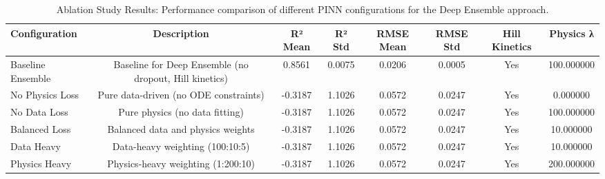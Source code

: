 \begin{table}
\caption{Ablation Study Results: Performance comparison of different PINN configurations for the Deep Ensemble approach.}
\label{tab:ablation_study}
\begin{tabular}{lccccccc}
\toprule
Configuration & Description & R² Mean & R² Std & RMSE Mean & RMSE Std & Hill Kinetics & Physics λ \\
\midrule
Baseline Ensemble & Baseline for Deep Ensemble (no dropout, Hill kinetics) & 0.8561 & 0.0075 & 0.0206 & 0.0005 & Yes & 100.000000 \\
No Physics Loss & Pure data-driven (no ODE constraints) & -0.3187 & 1.1026 & 0.0572 & 0.0247 & Yes & 0.000000 \\
No Data Loss & Pure physics (no data fitting) & -0.3187 & 1.1026 & 0.0572 & 0.0247 & Yes & 100.000000 \\
Balanced Loss & Balanced data and physics weights & -0.3187 & 1.1026 & 0.0572 & 0.0247 & Yes & 10.000000 \\
Data Heavy & Data-heavy weighting (100:10:5) & -0.3187 & 1.1026 & 0.0572 & 0.0247 & Yes & 10.000000 \\
Physics Heavy & Physics-heavy weighting (1:200:10) & -0.3187 & 1.1026 & 0.0572 & 0.0247 & Yes & 200.000000 \\
\bottomrule
\end{tabular}
\end{table}
